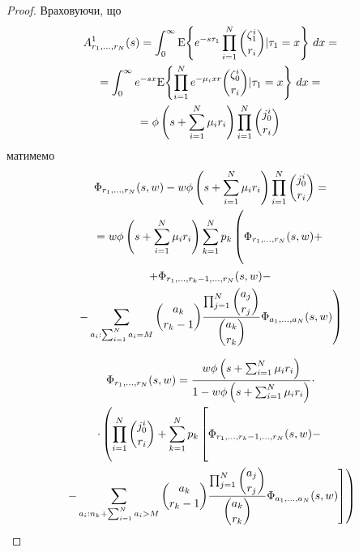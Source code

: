 \documentclass{KnuBulletin}
\begin{document}
\begin{multicols}{2}
\begin{proof}
    	Враховуючи, що
        \begin{gather*}
        A_{r_1,...,r_N}^{1}(s)
        =\int_{0}^{\infty}
        {{\rm E}{\left\{e^{-s\tau_1} \prod_{i=1}^N \dbinom{\zeta_{1}^i}{r_i}|\tau_1=x\right\}}} \ dx
        =\\=
        \int_{0}^{\infty} e^{-sx}
        {{\rm E}{\left\{\prod_{i=1}^N e^{-\mu_i x r}\dbinom{\zeta_{0}^i}{r_i}|\tau_1=x\right\}}} \ dx
        =\\=
        \phi\left(s+\sum_{i=1}^N \mu_i r_i\right)
        \prod_{i=1}^N \dbinom{j_{0}^i}{r_i}
        \end{gather*}
        матимемо
        \begin{multline*}
        \Phi_{r_1,...,r_N}(s,w)
        - w \phi\left(s+\sum_{i=1}^N \mu_i r_i\right)
        \prod_{i=1}^N \dbinom{j_{0}^i}{r_i}
        =\\=
        w\phi\left(s+\sum_{i=1}^N \mu_i r_i\right)
        \sum_{k=1}^N p_k
        \left(\vphantom{\sum_\sum}
        \Phi_{r_1,...,r_N}(s,w)
        +
        \right.\\\left.
        +
        \Phi_{r_1,\dots,r_{k}-1,\dots,r_N}(s,w)
        -
        \right.\\\left.
        -
        \sum_{a_i: \sum_{i=1}^N a_i = M}
        \dbinom{a_k}{r_k-1}
        \frac{\prod_{j=1}^N \dbinom{a_j}{r_j}} {\dbinom{a_k}{r_k}}
        \Phi_{a_1,...,a_N}(s,w)
        \right)
        \end{multline*}
        
        \begin{multline*}
        \Phi_{r_1,...,r_N}(s,w)
        =
        \frac
        {w \phi\left(s+\sum_{i=1}^N \mu_i r_i\right)}
        {1- w \phi\left(s+\sum_{i=1}^N \mu_i r_i\right)}
        \cdot
        \\
        \cdot
        \left(
        \prod_{i=1}^N \dbinom{j_{0}^i}{r_i}
        +
        \sum_{k=1}^N p_k
        \left[\vphantom{\sum_\sum}
        \Phi_{r_1,\dots,r_{k}-1,\dots,r_N}(s,w)
        -
        \right.\right.\\\left.\left.
        -
        \sum_{a_i: n_k+\sum_{i=1}^N a_i > M}
        \dbinom{a_k}{r_k-1}
        \frac{\prod_{j=1}^N \dbinom{a_j}{r_j}} {\dbinom{a_k}{r_k}}
        \Phi_{a_1,...,a_N}(s,w)
        \right]
        \right)
        \end{multline*}
        

\end{proof}
\end{multicols}
\end{document}
